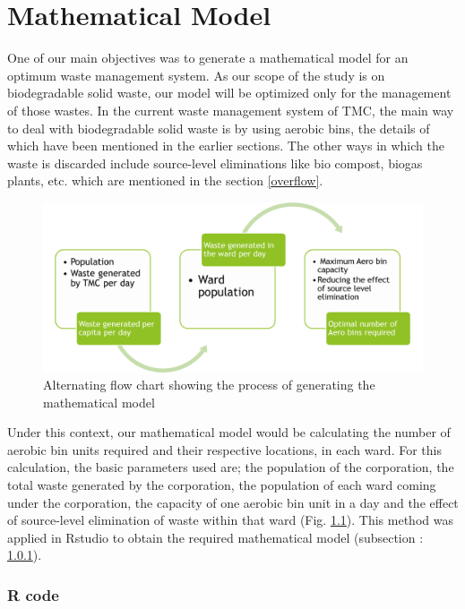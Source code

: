 \documentclass[12pt,a4paper]{report}
\begin{document}
\chapter{\textbf{Mathematical Model}}
One of our main objectives was to generate a mathematical model for an optimum waste management system. As our scope of the study is on biodegradable solid waste, our model will be optimized only for the management of those wastes. In the current waste management system of TMC, the main way to deal with biodegradable solid waste is by using aerobic bins, the details of which have been mentioned in the earlier sections. The other ways in which the waste is discarded include source-level eliminations like bio compost, biogas plants, etc. which are mentioned in the section \ref{overflow}.

\begin{figure}[H]
	\centering
	\includegraphics[width=0.8\linewidth]{mathmod}
	\caption{Alternating flow chart showing the process of generating the mathematical model}
	\label{fig:mathmod}
\end{figure}

Under this context, our mathematical model would be calculating the number of aerobic bin units required and their respective locations, in each ward. For this calculation, the basic parameters used are; the population of the corporation, the total waste generated by the corporation, the population of each ward coming under the corporation, the capacity of one aerobic bin unit in a day and the effect of source-level elimination of waste within that ward (Fig. \ref{fig:mathmod}). This method was applied in Rstudio to obtain the required mathematical model (subsection : \ref{Rcode}). 


\newpage
\subsection{R code}
\label{Rcode}
\lstset{style=mystyle}

\end{document}
